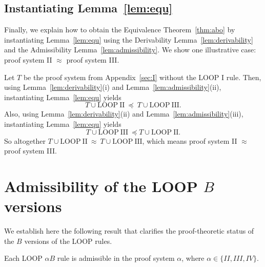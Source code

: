 \documentclass[runningheads]{llncs}       %
\begin{document}
\subsection{Instantiating Lemma~\ref{lem:equ}}
\label{subsec:instantiate}

Finally, we explain how to obtain the Equivalence Theorem~\ref{thm:abo} by instantiating Lemma~\ref{lem:equ}
using the Derivability Lemma~\ref{lem:derivability} and the Admissibility Lemma~\ref{lem:admissibility}.
We show one illustrative case: proof system II $\approx$ proof system III.

Let $T$ be the proof system from Appendix~\ref{sec:I} without the LOOP I rule.
Then, using Lemma~\ref{lem:derivability}(i) and Lemma~\ref{lem:admissibility}(ii), 
instantiating Lemma~\ref{lem:equ} yields
\[
 T \cup \mathrm{LOOP\ II}\ \preceq\ T \cup \mathrm{LOOP\ III}.
\]
Also, using Lemma~\ref{lem:derivability}(ii) and Lemma~\ref{lem:admissibility}(iii), 
instantiating Lemma~\ref{lem:equ} yields
\[
 T \cup \mathrm{LOOP\ III}\ \preceq T \cup \mathrm{LOOP\ II}.
\]
So altogether $T \cup \mathrm{LOOP\ II}\ \approx\ T \cup \mathrm{LOOP\ III}$,
which means proof system II $\approx$ proof system III.


\section{Admissibility of the LOOP $B$ versions}
\label{sec:B}

We establish here the following result that clarifies the
proof-theoretic status of the $B$ versions of the LOOP rules.

\begin{theorem}
  Each LOOP $\alpha B$ rule is admissible in the proof system
  $\alpha$, where $\alpha \in \{II, III, IV\}$.
\end{theorem}
\end{document}
